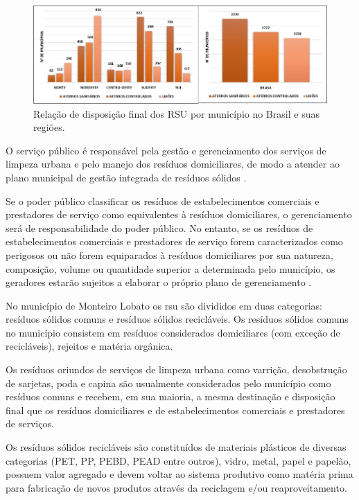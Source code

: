 \begin{figure}
	\centering
	\includegraphics[width=0.75\linewidth]{produtos/prodtres/image005}
	\caption{Relação de disposição final dos RSU por município no Brasil e suas regiões.}
	\label{fig:image005}
\end{figure}

O serviço público é responsável pela gestão e gerenciamento dos serviços de limpeza urbana e pelo manejo dos resíduos domiciliares, de modo a atender ao plano municipal de gestão integrada de resíduos sólidos \cite{brasil:12305}.

Se o poder público classificar os resíduos de estabelecimentos comerciais e prestadores de serviço como equivalentes à resíduos domiciliares, o gerenciamento será de responsabilidade do poder público. No entanto, se os resíduos de estabelecimentos comerciais e prestadores de serviço forem caracterizados como perigosos ou não forem equiparados à resíduos domiciliares por sua natureza, composição, volume ou quantidade superior a determinada pelo município, os geradores estarão sujeitos a elaborar o próprio plano de gerenciamento \cite{brasil:12305}.

No município de Monteiro Lobato os \gls{rsu} são divididos em duas categorias: resíduos sólidos comuns e resíduos sólidos recicláveis. Os resíduos sólidos comuns no município consistem em resíduos considerados domiciliares (com exceção de recicláveis), rejeitos e matéria orgânica. 

Os resíduos oriundos de serviços de limpeza urbana como varrição, desobstrução de sarjetas, poda e capina são usualmente considerados pelo município como resíduos comuns e recebem, em sua maioria, a mesma destinação e disposição final que os resíduos domiciliares e de estabelecimentos comerciais e prestadores de serviços.

Os resíduos sólidos recicláveis são constituídos de materiais plásticos de diversas categorias (PET, PP, PEBD, PEAD entre outros), vidro, metal, papel e papelão, possuem valor agregado e devem voltar ao sistema produtivo como matéria prima para fabricação de novos produtos através da reciclagem e/ou reaproveitamento.

